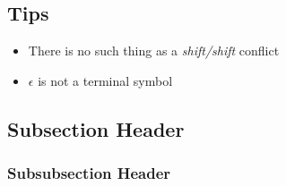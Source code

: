 \documentclass[fontsize=10pt,a4paper]{article}
\begin{document}
\begin{multicols}{3}

    \small
    \section{Tips}

    \begin{itemize}
        \item There is no such thing as a \textit{shift/shift} conflict
        \item $\epsilon$ is not a terminal symbol
    \end{itemize}


    \subsection{Subsection Header}
    \subsubsection{Subsubsection Header}

\end{multicols}
\end{document}
